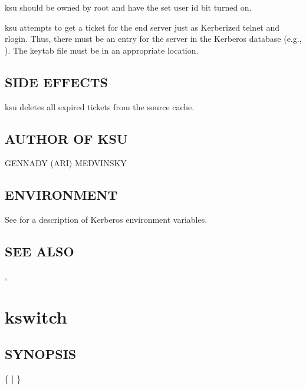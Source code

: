 \documentclass[letterpaper,10pt,english]{sphinxmanual}
\begin{document}
\sphinxAtStartPar
ksu should be owned by root and have the set user id bit turned on.

\sphinxAtStartPar
ksu attempts to get a ticket for the end server just as Kerberized
telnet and rlogin.  Thus, there must be an entry for the server in the
Kerberos database (e.g., ).  The keytab
file must be in an appropriate location.


\subsection{SIDE EFFECTS}
\label{\detokenize{user/user_commands/ksu:side-effects}}
\sphinxAtStartPar
ksu deletes all expired tickets from the source cache.


\subsection{AUTHOR OF KSU}
\label{\detokenize{user/user_commands/ksu:author-of-ksu}}
\sphinxAtStartPar
GENNADY (ARI) MEDVINSKY


\subsection{ENVIRONMENT}
\label{\detokenize{user/user_commands/ksu:environment}}
\sphinxAtStartPar
See {\hyperref[\detokenize{user/user_config/kerberos:kerberos-7}]{}} for a description of Kerberos environment
variables.


\subsection{SEE ALSO}
\label{\detokenize{user/user_commands/ksu:see-also}}
\sphinxAtStartPar
{\hyperref[\detokenize{user/user_config/kerberos:kerberos-7}]{}}, {\hyperref[\detokenize{user/user_commands/kinit:kinit-1}]{}}


\section{kswitch}
\label{\detokenize{user/user_commands/kswitch:kswitch}}\label{\detokenize{user/user_commands/kswitch:kswitch-1}}\label{\detokenize{user/user_commands/kswitch::doc}}

\subsection{SYNOPSIS}
\label{\detokenize{user/user_commands/kswitch:synopsis}}
\sphinxAtStartPar
{}
\{ | \}
\end{document}
